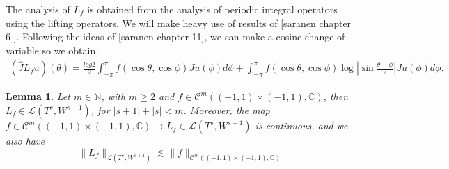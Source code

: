 \documentclass{article}
\newtheorem{lemma}[theorem]{Lemma}
\newcommand{\todo}[1]{{\color{red}[#1]}}
\newcommand{\IC}{{\mathbb C}}
\newcommand{\IN}{{\mathbb N}}
\newcommand{\cmspace}[3]{\mathcal{C}^{#1} \left( #2, #3 \right)}
\newcommand{\iinterv}{(-1,1)\times(-1,1)}
\begin{document}
The analysis of $L_f$ is obtained from the analysis of periodic integral operators using the lifting operators. We will make heavy use of results of \todo{saranen chapter 6  }. Following the ideas of \todo{saranen chapter 11}, we can make a cosine change of variable so we obtain,
\begin{align}
\label{eq:Lsplit}
(\widehat{J}L_fu)(\theta) = \frac{log{2}}{2} \int_{-\pi}^{\pi} f(\cos \theta , \cos \phi) Ju(\phi) d\phi + \int_{-\pi}^{\pi} f(\cos \theta, \cos \phi) \log \left\vert \sin \frac{\theta-\phi}{2} \right\vert Ju(\phi) d\phi.
\end{align}

\begin{lemma}
\label{lemma:Lfoperator}
Let $m \in \IN$, with $m\geq 2$ and $f \in \cmspace{m}{\iinterv}{\IC}$, then $L_f \in \mathcal{L}(T^s,W^{s+1})$, for $|s+1| +|s| <m$. Moreover, the map $f \in \cmspace{m}{\iinterv}{\IC} \mapsto L_f \in \mathcal{L}(T^s,W^{s+1})$ is continuous, and we also have 
$$
\|L_f\|_{\mathcal{L}(T^s,W^{s+1})} \lesssim \|f\|_{\cmspace{m}{\iinterv}{\IC}}
$$
\end{lemma}
\end{document}
